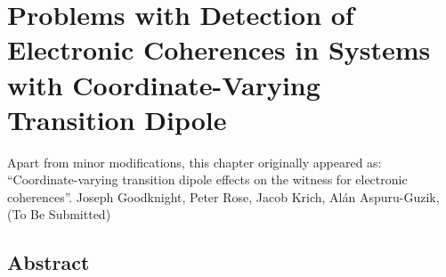 \chapter{Problems with Detection of Electronic Coherences in Systems with Coordinate-Varying Transition Dipole}\label{ch:nonCondon}
\thispagestyle{plain}
\vspace{-.5cm}

\noindent Apart from minor modifications, this chapter originally appeared as:\newline\\
\ssp ``Coordinate-varying transition dipole effects on the witness for electronic coherences''.
Joseph Goodknight, Peter Rose, Jacob Krich, Al\'an Aspuru-Guzik, (To Be Submitted)

\section*{Abstract}
   \dsp
   


